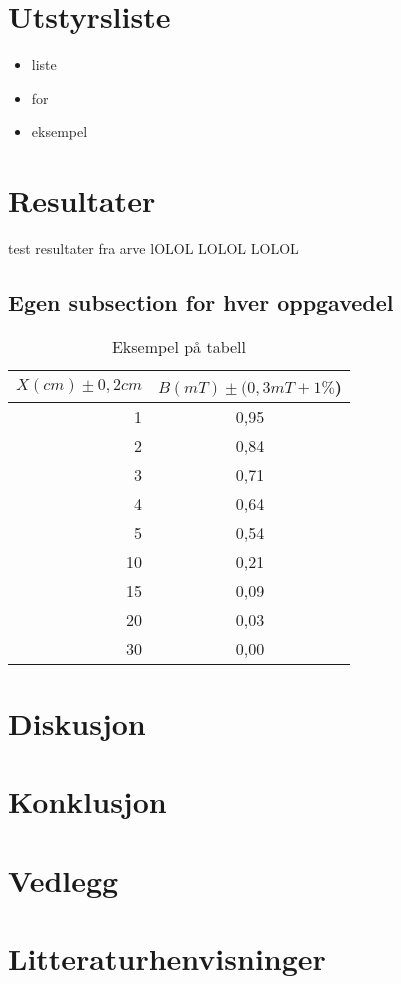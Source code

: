 \documentclass[12pt,norsk,a4paper]{article}
\begin{document}
\section{Utstyrsliste} 
    \begin{itemize} %
    \item liste     %
    \item for
    \item eksempel
    \end{itemize}
\clearpage


\section{Resultater}
test resultater fra arve lOLOL
LOLOL
LOLOL

\subsection{Egen subsection for hver oppgavedel}


\begin{table}[H] %
\begin{center}
	\begin{tabular}{ | r | c |} %
	\hline
	$X(cm )\pm0,2cm$  &$B(mT)\pm(0,3mT+1\%$) \\ \hline %
    1 & 0,95\\ \hline   %
    2 & 0,84\\ \hline
    3 & 0,71\\ \hline
    4 & 0,64\\ \hline
    5 & 0,54\\ \hline
    10 & 0,21\\ \hline
    15 & 0,09\\ \hline
    20 & 0,03\\ \hline
    30 & 0,00\\ \hline
    \hline
    \end{tabular}
    \end{center}
    \caption{Eksempel på tabell}

\end{table}
\clearpage

\section{Diskusjon}
\clearpage

\section{Konklusjon}
\clearpage

\section{Vedlegg}
\clearpage
\section{Litteraturhenvisninger}
\end{document}
